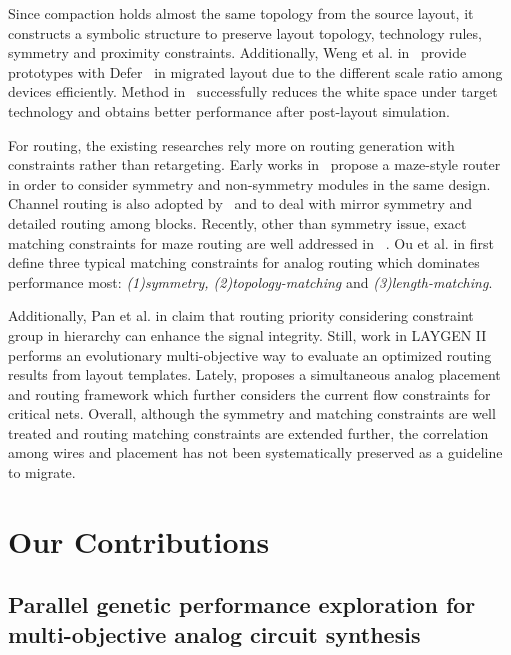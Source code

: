       Since compaction holds almost the same topology from the source layout, it constructs a symbolic structure to preserve layout topology, technology rules, symmetry and proximity constraints. Additionally, Weng et al. in~\cite{ALP_YPWeng_iccad2011} provide prototypes with Defer~\cite{defer_jackey_tcad10} in migrated layout due to the different scale ratio among devices efficiently. Method in~\cite{ALP_YPWeng_iccad2011} successfully reduces the white space under target technology and obtains better performance after post-layout simulation. 

      For routing, the existing researches rely more on routing generation with constraints rather than retargeting. Early works in~\cite{KOAN_ANAGRAMII-JSSC1991,aicon_malE_tcad96,ppraic_Linfu_iccad2010} propose a maze-style router in order to consider symmetry and non-symmetry modules in the same design. Channel routing is also adopted by~\cite{cbcrams_UChoudhury_tcad93} and \cite{aicon_malE_tcad96} to deal with mirror symmetry and detailed routing among blocks. Recently, other than symmetry issue, exact matching constraints for maze routing are well addressed in ~\cite{ermams_MMOzdal_tcad09}. Ou et al. in \cite{numarmc_HCOu_dac12} first define three typical matching constraints for analog routing which dominates performance most: {\it(1)symmetry, (2)topology-matching} and {\it (3)length-matching}. 

      Additionally, Pan et al. in \cite{Pan_CGR_ICCAD2012} claim that routing priority considering constraint group in hierarchy can enhance the signal integrity. Still, work in LAYGEN II \cite{LAYGENII_TCAD13} performs an evolutionary multi-objective way to evaluate an optimized routing results from layout templates. Lately, \cite{SAPR_DAC13} proposes a simultaneous analog placement and routing framework which further considers the current flow constraints for critical nets. Overall, although the symmetry and matching constraints are well treated and routing matching constraints are extended further, the correlation among wires and placement has not been systematically preserved as a guideline to migrate.

  \section{Our Contributions}\label{sec:contribution}
    \subsection{Parallel genetic performance exploration for multi-objective analog circuit synthesis}

